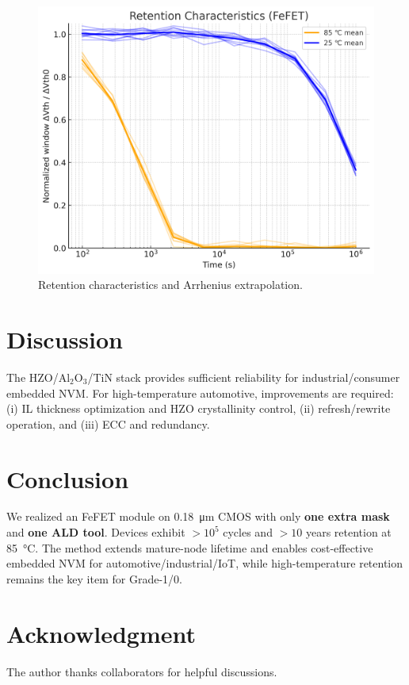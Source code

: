 \documentclass[conference]{IEEEtran}
\begin{document}
\begin{figure}[t]
  \centering
  \includegraphics[width=\linewidth]{figures/fig6_retention.png}
  \caption{Retention characteristics and Arrhenius extrapolation.}
  \label{fig:retention}
\end{figure}

\section{Discussion}
The HZO/Al\(_2\)O\(_3\)/TiN stack provides sufficient reliability for industrial/consumer embedded NVM.  
For high-temperature automotive, improvements are required: (i) IL thickness optimization and HZO crystallinity control, (ii) refresh/rewrite operation, and (iii) ECC and redundancy.

\section{Conclusion}
We realized an FeFET module on \SI{0.18}{\micro m} CMOS with only \textbf{one extra mask} and \textbf{one ALD tool}. 
Devices exhibit \(>10^{5}\) cycles and \(>\!10\) years retention at \SI{85}{\celsius}. 
The method extends mature-node lifetime and enables cost-effective embedded NVM for automotive/industrial/IoT, while high-temperature retention remains the key item for Grade-1/0.

\section*{Acknowledgment}
The author thanks collaborators for helpful discussions.
\end{document}
